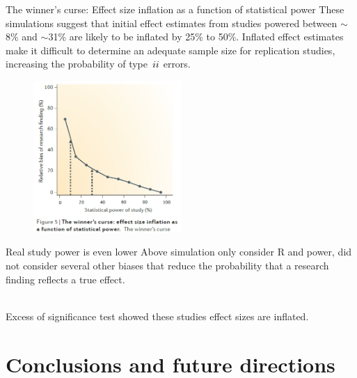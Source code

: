 \documentclass{beamer}
\begin{document}
	\begin{frame}{The winner’s curse: Effect size inflation as a function of statistical power}
		\fontsize{10pt}{12pt}\selectfont
		These simulations suggest that initial effect estimates from studies powered between $\sim$8\% and $\sim$31\% are likely to be inflated by 25\% to 50\%. Inflated effect estimates make it difficult to determine an adequate sample size for replication studies, increasing the probability of type $\uppercase\expandafter{\romannumeral2}$ errors.
		\begin{figure}[H]
			\centering
			\includegraphics[width=0.5\textwidth]{pics/winner curse discussion.png}
		\end{figure}
	\end{frame}
	
	

	
	\begin{frame}{Real study power is even lower}
		Above simulation only consider R and power, did not consider several other biases that reduce the probability that a research finding reflects a true effect. 
		
		~\\Excess of significance test showed these studies effect sizes are inflated.
	\end{frame}
	
	\section{Conclusions and future directions}
	
\end{document}
